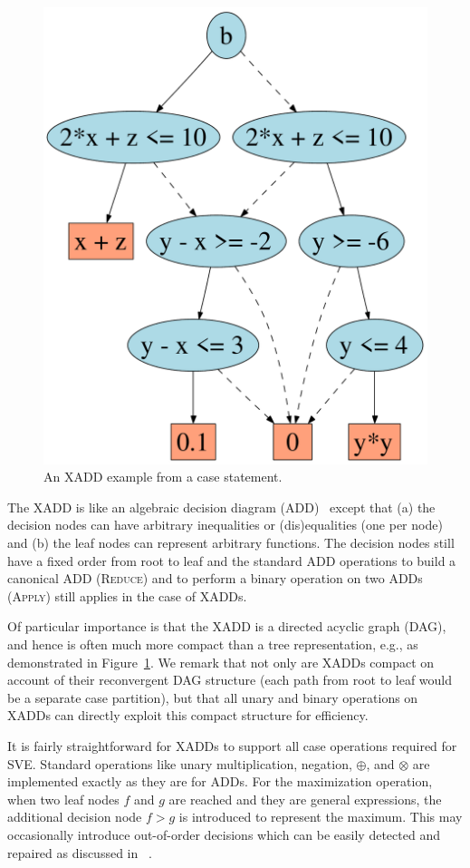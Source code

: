 \documentclass[letterpaper]{article}
\begin{document}
{%
\begin{figure}[t!]
\begin{center}
\vspace{-1mm}
\includegraphics[width=.2\textwidth]{norm_unif.pdf}
\end{center}
\vspace{-2mm}
\caption{\footnotesize An XADD example from a case statement.%
} \label{fig:xadd}
\vspace{-4mm}
\end{figure}

The XADD is like an algebraic decision 
diagram (ADD)~\cite{bahar93add} except that (a) the decision
nodes can have arbitrary inequalities or (dis)equalities (one
per node) and (b) the leaf nodes can represent arbitrary functions.
The decision nodes still have a fixed order from root to leaf
and the standard ADD
operations to build a canonical ADD (\textsc{Reduce}) and 
to perform a binary operation on two ADDs (\textsc{Apply}) 
still applies in the case of XADDs. 

Of particular importance is that the XADD is a directed acyclic graph
(DAG), and hence is often much more compact than a tree
representation, e.g., as demonstrated in 
Figure~\ref{fig:xadd}.
We remark that not only are XADDs compact on account of their
reconvergent DAG structure (each path from root to leaf would be a separate
case partition), but that all unary and binary operations
on XADDs can directly exploit this compact structure for efficiency.

It is fairly straightforward for XADDs to support all case operations
required for SVE.  Standard operations like unary multiplication,
negation, $\oplus$, and $\otimes$ are implemented exactly as they
are for ADDs.  For the maximization operation, when two leaf
nodes $f$ and $g$ are reached and they are general expressions,
the additional decision node $f > g$ is introduced to represent
the maximum.  This may occasionally introduce out-of-order decisions
which can be easily detected and repaired as discussed in~\cite{uai11} .

}
\end{document}

